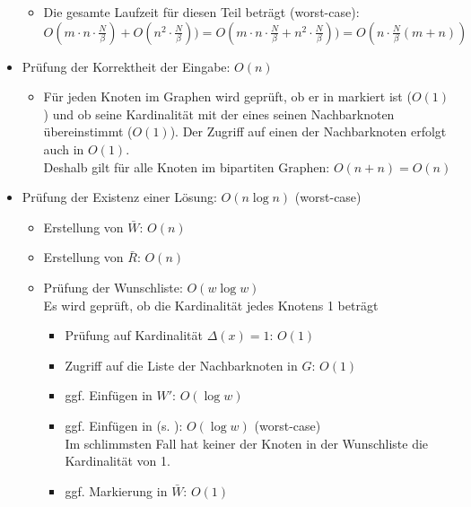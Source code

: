 \begin{itemize}
\begin{itemize}
    \item Die gesamte Laufzeit für diesen Teil beträgt (worst-case):\\
    $O(m \cdot n \cdot\frac{N}{\beta}) + O(n^2 \cdot\frac{N}{\beta})) = 
    O(m \cdot n \cdot\frac{N}{\beta} + n^2 \cdot\frac{N}{\beta})) = O(n\cdot \frac{N}{\beta}(m + n))$ 
    \vspace{9pt}
  \end{itemize}

  \item Prüfung der Korrektheit der Eingabe: $O(n)$
  \begin{itemize}
    \item Für jeden Knoten im Graphen wird geprüft, ob 
    er in  markiert ist ($O(1)$) und ob seine Kardinalität mit der eines seinen
    Nachbarknoten übereinstimmt ($O(1)$). Der Zugriff auf einen der Nachbarknoten erfolgt auch in $O(1)$.\\
    Deshalb gilt für alle Knoten im bipartiten Graphen: $O(n + n) = O(n)$
  \end{itemize}

  \item Prüfung der Existenz einer Lösung: $O(n \log n)$ (worst-case)
  \begin{itemize}
    \item Erstellung von $\bar{W}$: $O(n)$

    \item Erstellung von $\bar{R}$: $O(n)$

    \item Prüfung der Wunschliste: $O(w \log w)$\\
    Es wird geprüft, ob die Kardinalität jedes Knotens 1 beträgt
    \begin{itemize}
    \item Prüfung auf Kardinalität $\Delta(x) = 1$: $O(1)$
    \item Zugriff auf die Liste der Nachbarknoten in $G$: $O(1)$
    \item ggf. Einfügen in $W'$: $O(\log w)$
    \item ggf. Einfügen in  (s. ): $O(\log w)$ (worst-case)\\
    Im schlimmsten Fall hat keiner der Knoten in der Wunschliste die Kardinalität von 1.
    \item ggf. Markierung in $\bar{W}$: $O(1)$
    \end{itemize}


\end{itemize}
\end{itemize}
